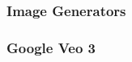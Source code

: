 \begin{frame}
    \frametitle{Image Generators}
    
    \begin{figure}
       \centering
    \end{figure}

\end{frame}

\begin{frame}
    \frametitle{Google Veo 3}
    
    \begin{figure}
       \centering
    \end{figure}

\end{frame}

